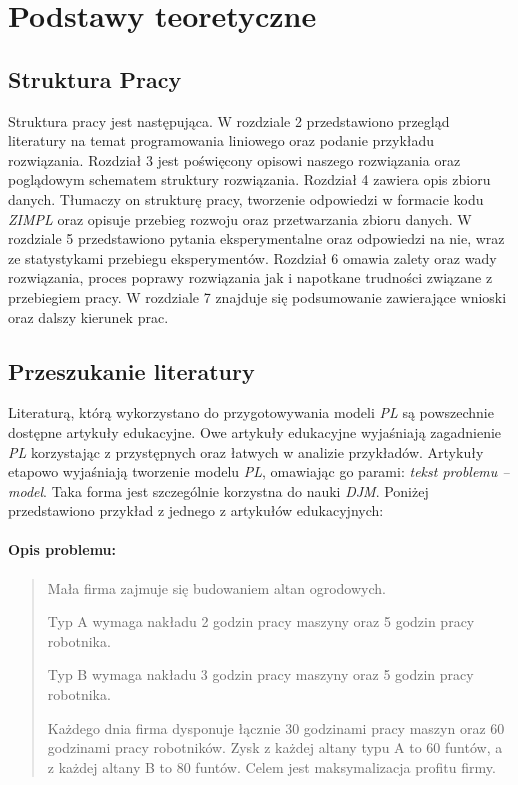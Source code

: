 
\chapter{Podstawy teoretyczne}

\section{Struktura Pracy}

Struktura pracy jest następująca. W rozdziale 2 przedstawiono przegląd literatury na temat programowania liniowego oraz podanie przykładu rozwiązania. Rozdział 3 jest poświęcony opisowi naszego rozwiązania oraz poglądowym schematem struktury rozwiązania. Rozdział 4 zawiera opis zbioru danych. Tłumaczy on strukturę pracy, tworzenie odpowiedzi w formacie kodu \textit{ZIMPL} oraz opisuje przebieg rozwoju oraz przetwarzania zbioru danych. W rozdziale 5 przedstawiono pytania eksperymentalne oraz odpowiedzi na nie, wraz ze statystykami przebiegu eksperymentów. Rozdział 6 omawia zalety oraz wady rozwiązania, proces poprawy rozwiązania jak i napotkane trudności związane z przebiegiem pracy. W rozdziale 7 znajduje się podsumowanie zawierające wnioski oraz dalszy kierunek prac.

\section{Przeszukanie literatury}

Literaturą, którą wykorzystano do przygotowywania modeli \textit{PL} są powszechnie dostępne artykuły edukacyjne. Owe artykuły edukacyjne wyjaśniają zagadnienie \textit{PL} korzystając z przystępnych oraz łatwych w analizie przykładów. Artykuły etapowo wyjaśniają tworzenie modelu \textit{PL}, omawiając go parami: \textit{tekst problemu -- model}. Taka forma jest szczególnie korzystna do nauki \textit{DJM}. Poniżej przedstawiono przykład z jednego z artykułów edukacyjnych\cite{cimt}:

\subsubsection*{Opis problemu:} \label{sec:model_example}
\begin{quote}
Mała firma zajmuje się budowaniem altan ogrodowych.

Typ A wymaga nakładu 2 godzin pracy maszyny oraz 5 godzin pracy robotnika.  

Typ B wymaga nakładu 3 godzin pracy maszyny oraz 5 godzin pracy robotnika. 

Każdego dnia firma dysponuje łącznie 30 godzinami pracy maszyn oraz 60 godzinami pracy robotników. Zysk z każdej altany typu A to 60 funtów, a z każdej altany B to 80 funtów. Celem jest maksymalizacja profitu firmy.

\end{quote}

